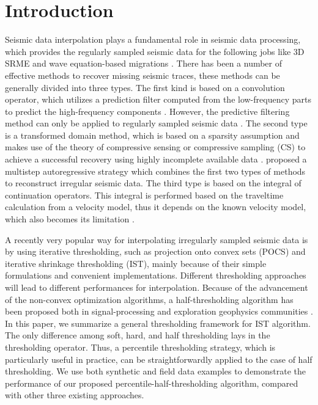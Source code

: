 \section{Introduction}
Seismic data interpolation plays a fundamental role in seismic data processing, which provides the regularly sampled seismic data for the following jobs like 3D SRME and wave equation-based migrations \cite[]{shengxu2010}. There has been a number of effective methods to recover missing seismic traces, these methods can be generally divided into three types. The first kind is based on a convolution operator, which utilizes a prediction filter computed from the low-frequency parts to predict the high-frequency components \cite[]{spitz1991,porsani1999,wang2002}. However, the predictive filtering method can only be applied to regularly sampled seismic data \cite[]{mostafa2007}. The second type is a transformed domain method, which is based on a sparsity assumption and makes use of the theory of compressive sensing or compressive sampling (CS) \cite[]{candes20062,donoho2006,mallat2009,herrmann2010} to achieve a successful recovery using highly incomplete available data \cite[]{sacchi1998,wang2003,zwartjes20071,zwartjes20072,pengliang2012,pengliang2013}. \cite{mostafa2007} proposed a multistep autoregressive strategy which combines the first two types of methods to reconstruct irregular seismic data. The third type is based on the integral of continuation operators. This integral is performed based on the traveltime calculation from a velocity model, thus it depends on the known velocity model, which also becomes its limitation \cite[]{canning1996,bleistein2000,stolt2002,fomel2003}.

A recently very popular way for interpolating irregularly sampled seismic data is by using iterative thresholding, such as projection onto convex sets (POCS) and iterative shrinkage thresholding (IST), mainly because of their simple formulations and convenient implementations. Different thresholding approaches will lead to different performances for interpolation. 
Because of the advancement of the non-convex optimization algorithms, a half-thresholding algorithm has been proposed both in signal-processing and exploration geophysics communities \cite[]{pengliang20131,zongben2012}. In this paper, we summarize a general thresholding framework for IST algorithm. The only difference among soft, hard, and half thresholding lays in the thresholding operator. Thus, a percentile thresholding strategy, which is particularly useful in practice, can be straightforwardly applied to the case of half thresholding. We use both synthetic and field data examples to demonstrate the performance of our proposed percentile-half-thresholding algorithm, compared with other three existing approaches.


